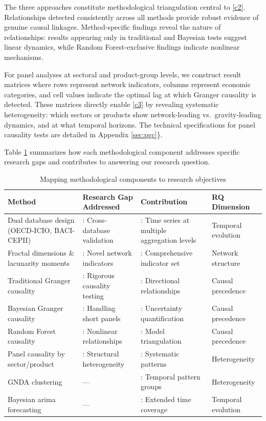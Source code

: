 \documentclass[preprint, 3p,
authoryear]{elsarticle} %
\begin{document}
The three approaches constitute methodological triangulation central to
\ref{c2}. Relationships detected consistently across all methods provide
robust evidence of genuine causal linkages. Method-specific findings
reveal the nature of relationships: results appearing only in
traditional and Bayesian tests suggest linear dynamics, while Random
Forest-exclusive findings indicate nonlinear mechanisms.

For panel analyses at sectoral and product-group levels, we construct
result matrices where rows represent network indicators, columns
represent economic categories, and cell values indicate the optimal lag
at which Granger causality is detected. These matrices directly enable
\ref{c3} by revealing systematic heterogeneity: which sectors or
products show network-leading vs.~gravity-leading dynamics, and at what
temporal horizons. The technical specifications for panel causality
tests are detailed in Appendix \ref{sec:pgc}\}.

Table \ref{tab:methods_summary} summarizes how each methodological
component addresses specific research gaps and contributes to answering
our research question.

\begin{table}[htbp]
\centering
\caption{Mapping methodological components to research objectives}
\label{tab:methods_summary}
\small
\begin{tabular}{p{3.5cm}p{4cm}p{4cm}p{3cm}}
\toprule
\textbf{Method} & \textbf{Research Gap Addressed} & \textbf{Contribution} & \textbf{RQ Dimension} \\
\midrule
Dual database design (OECD-ICIO, BACI-CEPII) & \nameref{rg3}: Cross-database validation & \nameref{c1}: Time series at multiple aggregation levels & Temporal evolution \\
\addlinespace
Fractal dimensions \& lacunarity moments & \nameref{rg2}: Novel network indicators & \nameref{c2}: Comprehensive indicator set & Network structure \\
\addlinespace
Traditional Granger causality & \nameref{rg1}: Rigorous causality testing & \nameref{c2}: Directional relationships & Causal precedence \\
\addlinespace
Bayesian Granger causality & \nameref{rg1}: Handling short panels & \nameref{c2}: Uncertainty quantification & Causal precedence \\
\addlinespace
Random Forest causality & \nameref{rg1}: Nonlinear relationships & \nameref{c2}: Model triangulation & Causal precedence \\
\addlinespace
Panel causality by sector/product & \nameref{rg4}: Structural heterogeneity & \nameref{c3}: Systematic patterns & Heterogeneity \\
\addlinespace
GNDA clustering & --- & \nameref{c1}: Temporal pattern groups & Heterogeneity \\
\addlinespace
Bayesian \gls{arima} forecasting & --- & \nameref{c1}: Extended time coverage & Temporal evolution \\
\bottomrule
\end{tabular}
\end{table}
\end{document}
